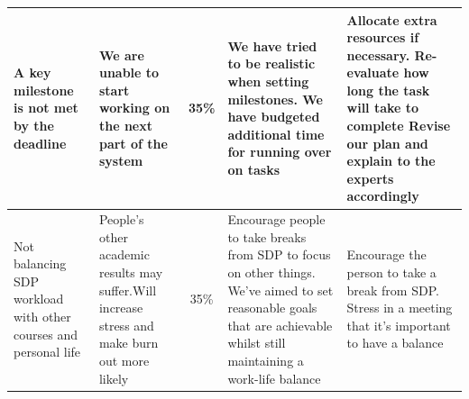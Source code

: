 \begin{tabular}{ ||p{3cm}|p{3cm}|c|p{4cm}|p{4cm}|| }
   A key milestone is not met by the deadline&
   We are unable to start working on the next part of the system&
   35\%&
   We have tried to be realistic when setting milestones. We have budgeted additional time for running over on tasks
&
   Allocate extra resources if necessary.
Re-evaluate how long the task will take to complete
Revise our plan and explain to the experts accordingly
 \\ \hline
   
    Not balancing SDP workload with other courses and personal life&
    
People’s other academic results may suffer.Will increase stress and make burn out more likely
&
    35\%&
   Encourage people to take breaks from SDP to focus on other things.
We’ve aimed to set reasonable goals that are achievable whilst still maintaining a work-life balance
 &
    Encourage the person to take a break from SDP. Stress in a meeting that it’s important to have a balance
 \\ \hline
    
     
 \hline \hline
\end{tabular}


